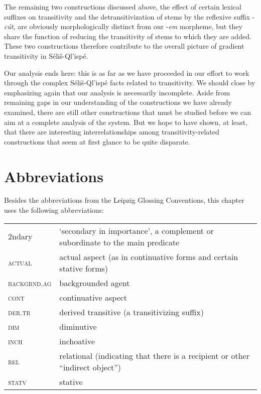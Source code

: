 \documentclass[output=paper,colorlinks,citecolor=brown]{langscibook}
\begin{document}
The remaining two constructions discussed above, the effect of certain
lexical suffixes on transitivity and the detransitivization of stems
by the reflexive suffix -\emph{c\'ut}, are obviously morphologically
distinct from our -\emph{em} morpheme, but they share the function of
reducing the transitivity of stems to which they are added.  These two
constructions therefore contribute to the overall picture of gradient
transitivity in S\'eli\v{s}-Ql'isp\'e.

Our analysis ends here: this is as far as we have proceeded in our
effort to work through the complex S\'eli\v{s}-Ql'isp\'e facts related
to transitivity.  We should close by emphasizing again that our
analysis is necessarily incomplete.  Aside from remaining gaps in our
understanding of the constructions we have already examined, there are
still other constructions that must be studied before we can aim at a
complete analysis of the system.  But we hope to have shown, at least,
that there are interesting interrelationships among
transitivity-related constructions that seem at first glance to be
quite disparate.

\section*{Abbreviations}

Besides the abbreviations from the Leipzig Glossing Conventions, this chapter uses the following
abbreviations:

\noindent
\begin{tabularx}{\textwidth}{lQ}
2ndary & `secondary in importance', a complement or subordinate to
  the main predicate \\
\textsc{actual} & actual aspect (as in continuative forms and certain stative forms) \\
\textsc{backgrnd.ag} & backgrounded agent \\
\textsc{cont} & continuative aspect \\
\textsc{der.tr} & derived transitive (a transitivizing suffix) \\
\textsc{dim} & diminutive \\
\textsc{inch} & inchoative \\
\textsc{rel} & relational (indicating that there is a recipient or other ``indirect object'') \\
\textsc{statv} & stative \\
\end{tabularx}
\end{document}
